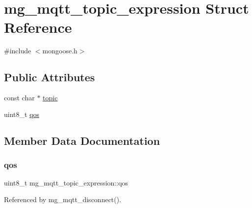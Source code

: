 \hypertarget{structmg__mqtt__topic__expression}{}\section{mg\+\_\+mqtt\+\_\+topic\+\_\+expression Struct Reference}
\label{structmg__mqtt__topic__expression}


{\ttfamily \#include $<$mongoose.\+h$>$}

\subsection*{Public Attributes}
\begin{DoxyCompactItemize}
\item 
const char $\ast$ \hyperlink{structmg__mqtt__topic__expression_a04074697217a1c329b32a9242d63ed8f_a04074697217a1c329b32a9242d63ed8f}{topic}
\item 
uint8\+\_\+t \hyperlink{structmg__mqtt__topic__expression_a56df5bba82939797c94dd68993b0beff_a56df5bba82939797c94dd68993b0beff}{qos}
\end{DoxyCompactItemize}


\subsection{Member Data Documentation}
\mbox{\label{structmg__mqtt__topic__expression_a56df5bba82939797c94dd68993b0beff_a56df5bba82939797c94dd68993b0beff}} 
\subsubsection{\texorpdfstring{qos}{qos}}
{\footnotesize\ttfamily uint8\+\_\+t mg\+\_\+mqtt\+\_\+topic\+\_\+expression\+::qos}



Referenced by mg\+\_\+mqtt\+\_\+disconnect().

\mbox{\label{structmg__mqtt__topic__expression_a04074697217a1c329b32a9242d63ed8f_a04074697217a1c329b32a9242d63ed8f}} 
